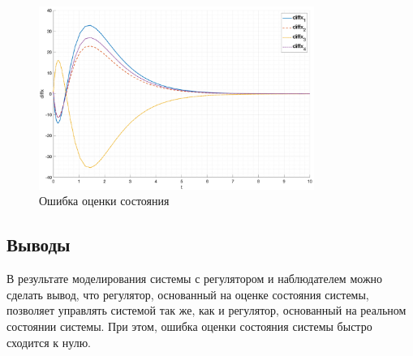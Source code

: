 \begin{figure}[ht!]
    \centering
    \includegraphics[width=0.8\textwidth]{media/plots/task3_diffx_1.png}
    \caption{Ошибка оценки состояния}
    \label{fig:task3_diff}
\end{figure}

\subsection{Выводы}
В результате моделирования системы с регулятором и наблюдателем можно сделать вывод, что регулятор, основанный 
на оценке состояния системы, позволяет управлять системой так же, как и регулятор, основанный на реальном
состоянии системы. При этом, ошибка оценки состояния системы быстро сходится к нулю. 